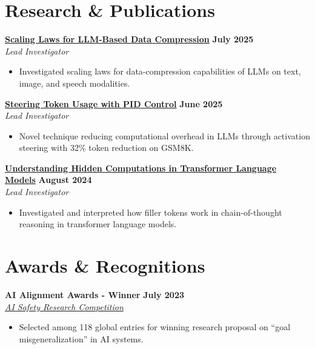 \documentclass[11pt]{article}
\begin{document}
\section{Research \& Publications}

\textbf{\href{https://fullwrong.com/2025/07/23/scaling-compression/}{Scaling Laws for LLM-Based Data Compression}} \hfill \textbf{July 2025} \\
\textit{Lead Investigator}
\begin{itemize}[leftmargin=*, nosep]
\item Investigated scaling laws for data-compression capabilities of LLMs on text, image, and speech modalities.
\end{itemize}

\textbf{\href{https://arxiv.org/abs/2506.18831}{Steering Token Usage with PID Control}} \hfill \textbf{June 2025} \\
\textit{Lead Investigator}
\begin{itemize}[leftmargin=*, nosep]
\item Novel technique reducing computational overhead in LLMs through activation steering with 32\% token reduction on GSM8K.
\end{itemize}

\textbf{\href{https://arxiv.org/html/2412.04537}{Understanding Hidden Computations in Transformer Language Models}} \hfill \textbf{August 2024} \\
\textit{Lead Investigator}
\begin{itemize}[leftmargin=*, nosep]
\item Investigated and interpreted how filler tokens work in chain-of-thought reasoning in transformer language models.
\end{itemize}

\section{Awards \& Recognitions}

\textbf{AI Alignment Awards - Winner} \hfill \textbf{July 2023} \\
\textit{\href{https://www.lesswrong.com/posts/zFoAAD7dfWdczxoLH/winners-of-ai-alignment-awards-research-contest}{AI Safety Research Competition}}
\begin{itemize}[leftmargin=*, nosep]
\item Selected among 118 global entries for winning research proposal on ``goal misgeneralization'' in AI systems.
\end{itemize}
\end{document}
